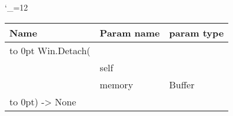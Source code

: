 \begingroup \catcode`\_=12 \tt
\begin{tabular}{lll}
\toprule
\textrm{Name}&\textrm{Param name}&\textrm{param type}\\
\midrule
\hbox to 0pt {Win.Detach(\hss}\\
& self\\
& memory & Buffer\\
\hbox to 0pt{) -> None\hss}\\
\bottomrule
\end{tabular}
\endgroup
